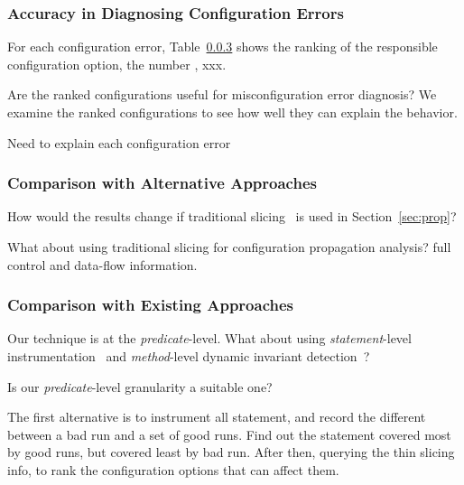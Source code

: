 \subsubsection{Accuracy in Diagnosing Configuration Errors}

For each configuration error, Table~\ref{} shows the ranking of the
responsible configuration option, the number , xxx.


Are the ranked configurations useful for misconfiguration error diagnosis?
We examine the ranked configurations to see how well they can explain the behavior.


Need to explain each configuration error


\subsubsection{Comparison with Alternative Approaches}


How would the results change if traditional slicing~\cite{Horwitz:1988} is used
in Section~\ref{sec:prop}?

What about using traditional slicing for configuration propagation analysis?
full control and data-flow information.

\subsubsection{Comparison with Existing Approaches}%


Our technique is at the \textit{predicate}-level. What about using
\textit{statement}-level instrumentation~\cite{Jones:2002}
 and \textit{method}-level dynamic invariant detection~\cite{Ernst:1999}?

Is our \textit{predicate}-level granularity a suitable one?

The first alternative is to instrument all statement, and record the different between a bad run and
a set of good runs. Find out the statement covered most by good runs, but covered least by bad run.
After then, querying the thin slicing info, to rank the configuration options that can affect them.


